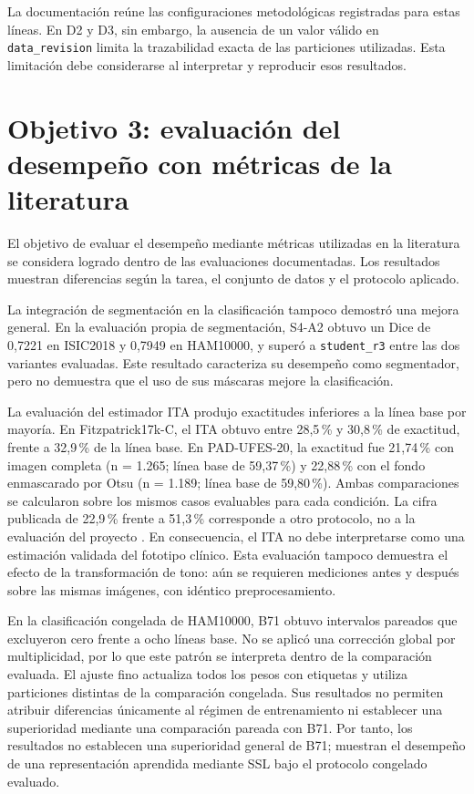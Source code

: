 La documentación reúne las configuraciones metodológicas registradas para estas líneas. En D2 y D3, sin embargo, la ausencia de un valor válido en \texttt{data\_revision} limita la trazabilidad exacta de las particiones utilizadas. Esta limitación debe considerarse al interpretar y reproducir esos resultados.

\section*{Objetivo 3: evaluación del desempeño con métricas de la literatura}

El objetivo de evaluar el desempeño mediante métricas utilizadas en la literatura se considera logrado dentro de las evaluaciones documentadas. Los resultados muestran diferencias según la tarea, el conjunto de datos y el protocolo aplicado.

La integración de segmentación en la clasificación tampoco demostró una mejora general. En la evaluación propia de segmentación, S4-A2 obtuvo un Dice de 0,7221 en ISIC2018 y 0,7949 en HAM10000, y superó a \texttt{student\_r3} entre las dos variantes evaluadas. Este resultado caracteriza su desempeño como segmentador, pero no demuestra que el uso de sus máscaras mejore la clasificación.

La evaluación del estimador ITA produjo exactitudes inferiores a la línea base por mayoría. En Fitzpatrick17k-C, el ITA obtuvo entre 28,5\,\% y 30,8\,\% de exactitud, frente a 32,9\,\% de la línea base. En PAD-UFES-20, la exactitud fue 21,74\,\% con imagen completa (n = 1.265; línea base de 59,37\,\%) y 22,88\,\% con el fondo enmascarado por Otsu (n = 1.189; línea base de 59,80\,\%). Ambas comparaciones se calcularon sobre los mismos casos evaluables para cada condición. La cifra publicada de 22,9\,\% frente a 51,3\,\% corresponde a otro protocolo, no a la evaluación del proyecto \parencite{alipour2026italimitations}. En consecuencia, el ITA no debe interpretarse como una estimación validada del fototipo clínico. Esta evaluación tampoco demuestra el efecto de la transformación de tono: aún se requieren mediciones antes y después sobre las mismas imágenes, con idéntico preprocesamiento.

En la clasificación congelada de HAM10000, B71 obtuvo intervalos pareados que excluyeron cero frente a ocho líneas base. No se aplicó una corrección global por multiplicidad, por lo que este patrón se interpreta dentro de la comparación evaluada. El ajuste fino actualiza todos los pesos con etiquetas y utiliza particiones distintas de la comparación congelada. Sus resultados no permiten atribuir diferencias únicamente al régimen de entrenamiento ni establecer una superioridad mediante una comparación pareada con B71. Por tanto, los resultados no establecen una superioridad general de B71; muestran el desempeño de una representación aprendida mediante SSL bajo el protocolo congelado evaluado.

